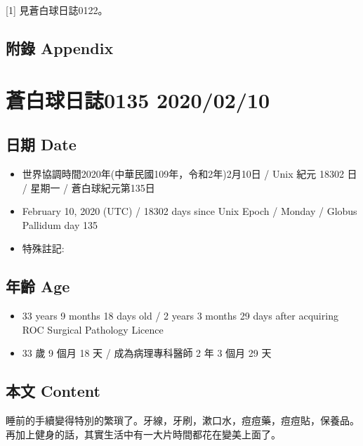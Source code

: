 \documentclass[
]{article}
\providecommand{\tightlist}{%
  \setlength{\itemsep}{0pt}\setlength{\parskip}{0pt}}
\begin{document}
{[}1{]} 見蒼白球日誌0122。

\hypertarget{ux9644ux9304-appendix-70}{%
\subsection{附錄 Appendix}\label{ux9644ux9304-appendix-70}}

\hypertarget{ux84bcux767dux7403ux65e5ux8a8c0135-20200210}{%
\section{蒼白球日誌0135
2020/02/10}\label{ux84bcux767dux7403ux65e5ux8a8c0135-20200210}}

\hypertarget{ux65e5ux671f-date-71}{%
\subsection{日期 Date}\label{ux65e5ux671f-date-71}}

\begin{itemize}
\tightlist
\item
  世界協調時間2020年(中華民國109年，令和2年)2月10日 / Unix 紀元 18302 日
  / 星期一 / 蒼白球紀元第135日
\item
  February 10, 2020 (UTC) / 18302 days since Unix Epoch / Monday /
  Globus Pallidum day 135
\item
  特殊註記:
\end{itemize}

\hypertarget{ux5e74ux9f61-age-71}{%
\subsection{年齡 Age}\label{ux5e74ux9f61-age-71}}

\begin{itemize}
\tightlist
\item
  33 years 9 months 18 days old / 2 years 3 months 29 days after
  acquiring ROC Surgical Pathology Licence
\item
  33 歲 9 個月 18 天 / 成為病理專科醫師 2 年 3 個月 29 天
\end{itemize}

\hypertarget{ux672cux6587-content-71}{%
\subsection{本文 Content}\label{ux672cux6587-content-71}}

睡前的手續變得特別的繁瑣了。牙線，牙刷，漱口水，痘痘藥，痘痘貼，保養品。再加上健身的話，其實生活中有一大片時間都花在變美上面了。
\end{document}
